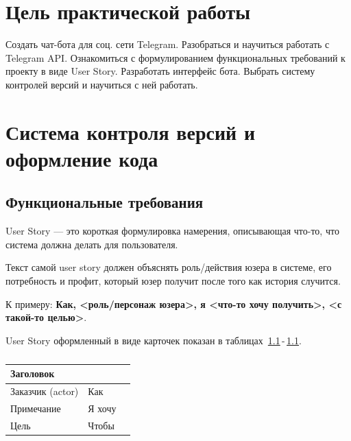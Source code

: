 \graphicspath{{./img/}} %

\chapter*{Цель практической работы}
Создать чат-бота для соц. сети Telegram. Разобраться и научиться работать
с Telegram API. Ознакомиться с формулированием функциональных
требований к проекту в виде User Story. Разработать интерфейс бота.
Выбрать систему контролей версий и научиться с ней работать.

\chapter{Система контроля версий и оформление кода}
\section{Функциональные требования}
User Story --- это короткая формулировка намерения, описывающая что-то,
что система должна делать для пользователя.\par
Текст самой user story должен объяснять роль/действия юзера в системе,
его потребность и профит, который юзер получит после того как история
случится.

К примеру: \textbf{Как, <роль/персонаж юзера>, я <что-то хочу получить>,
<с такой-то целью>}.

User Story оформленный в виде карточек показан
в таблицах~\ref{table:user_story:1}\,-\,\ref{}.

\begin{table}[h!tp]
	\centering
	\caption{}
	\label{table:user_story:1}
	\begin{tabular}{|l|l|l|}
		\hline \multicolumn{2}{|l|}{Заголовок} & \\ \hline
		Заказчик (actor) & Как & \\ \hline
		Примечание & Я хочу & \\ \hline
		Цель & Чтобы & \\ \hline
	\end{tabular}
\end{table}

